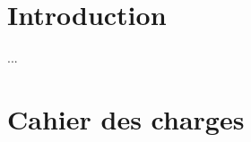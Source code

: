 \documentclass[12pt, a4paper, oneside, titlepage]{book}%
\begin{document}
\newpage
\pagestyle{fancy}  %
\mainmatter  %
\chapter{Introduction}\label{CHintro}
...
\vspace*{20mm}


\cleardoublepage %
\chapter{Cahier des charges}\label{CHcharges}





















\end{document}
